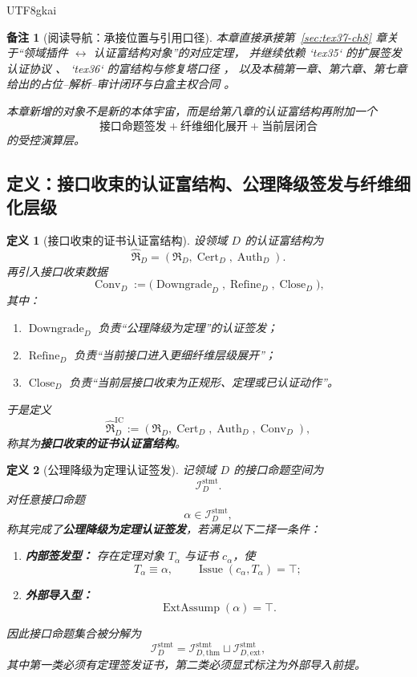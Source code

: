 \documentclass[12pt]{article}
\newtheorem{definition}{定义}[section]
\newtheorem{remark}{备注}[section]
\newcommand{\Cert}{\operatorname{Cert}}
\newcommand{\Auth}{\operatorname{Auth}}
\newcommand{\Conv}{\operatorname{Conv}}
\newcommand{\Downgrade}{\operatorname{Downgrade}}
\newcommand{\Refine}{\operatorname{Refine}}
\newcommand{\Close}{\operatorname{Close}}
\newcommand{\Issue}{\operatorname{Issue}}
\newcommand{\ExtAssump}{\operatorname{ExtAssump}}
\begin{document}
\begin{CJK*}{UTF8}{gkai}
\begin{remark}[阅读导航：承接位置与引用口径]
本章直接承接第~\ref{sec:tex37-ch8} 章关于“领域插件 $\leftrightarrow$ 认证富结构对象”的对应定理，
并继续依赖 `tex35` 的扩展签发认证协议 \cite{RepoTex35ExtendedCertificationTower}、
`tex36` 的富结构与修复塔口径 \cite{RepoTex36HomotopyTwistBijection}，
以及本稿第一章、第六章、第七章给出的占位--解析--审计闭环与白盒主权合同 \cite{RepoTex20SemanticGaugeNormalization,RepoTex21AuditedWrapper,
  RepoTex23SemanticBase,GaoZhengAppVol2,GaoZhengAppVol3,GaoZheng2025GFramework}。

本章新增的对象不是新的本体宇宙，而是给第八章的认证富结构再附加一个
\[
  \text{接口命题签发}
  +
  \text{纤维细化展开}
  +
  \text{当前层闭合}
\]
的受控演算层。
\end{remark}

\subsection{定义：接口收束的认证富结构、公理降级签发与纤维细化层级}
\label{subsec:tex37-ch9-definitions}

\begin{definition}[接口收束的证书认证富结构]
\label{def:tex37-ch9-ic-rich}
设领域 $D$ 的认证富结构为
\[
  \widehat{\mathfrak R}_D
  =
  (\mathfrak R_D,\Cert_D,\Auth_D).
\]
再引入接口收束数据
\[
  \Conv_D
  :=
  \bigl(
    \Downgrade_D,
    \Refine_D,
    \Close_D
  \bigr),
\]
其中：
\begin{enumerate}
  \item $\Downgrade_D$ 负责“公理降级为定理”的认证签发；
  \item $\Refine_D$ 负责“当前接口进入更细纤维层级展开”；
  \item $\Close_D$ 负责“当前层接口收束为正规形、定理或已认证动作”。
\end{enumerate}
于是定义
\[
  \widehat{\mathfrak R}_D^{\mathrm{IC}}
  :=
  (\mathfrak R_D,\Cert_D,\Auth_D,\Conv_D),
\]
称其为\textbf{接口收束的证书认证富结构}。
\end{definition}

\begin{definition}[公理降级为定理认证签发]
\label{def:tex37-ch9-downgrade}
记领域 $D$ 的接口命题空间为
\[
  \mathcal I_D^{\mathrm{stmt}}.
\]
对任意接口命题
\[
  \alpha\in \mathcal I_D^{\mathrm{stmt}},
\]
称其完成了\textbf{公理降级为定理认证签发}，若满足以下二择一条件：
\begin{enumerate}
  \item \textbf{内部签发型：}
  存在定理对象 $T_\alpha$ 与证书 $c_\alpha$，使
  \[
    T_\alpha\equiv \alpha,
    \qquad
    \Issue(c_\alpha,T_\alpha)=\top;
  \]
  \item \textbf{外部导入型：}
  \[
    \ExtAssump(\alpha)=\top.
  \]
\end{enumerate}
因此接口命题集合被分解为
\[
  \mathcal I_D^{\mathrm{stmt}}
  =
  \mathcal I_{D,\mathrm{thm}}^{\mathrm{stmt}}
  \sqcup
  \mathcal I_{D,\mathrm{ext}}^{\mathrm{stmt}},
\]
其中第一类必须有定理签发证书，第二类必须显式标注为外部导入前提。
\end{definition}


\end{CJK*}
\end{document}
